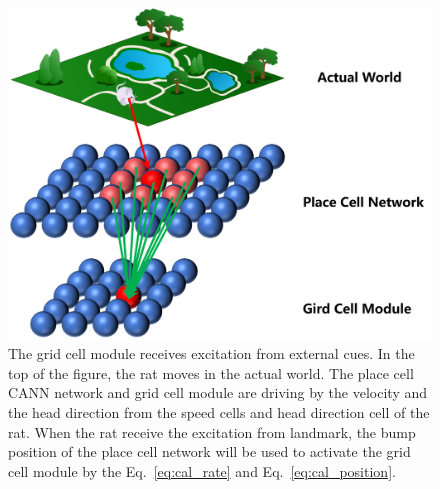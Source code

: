 \documentclass[final,5p,times,twocolumn]{elsarticle}
\begin{document}
\begin{figure}[!t]
	\centering
	\includegraphics[width=0.8\linewidth]{Figure/w-p-g.png}
	\caption{The grid cell module receives excitation from external cues. In the top of the figure, the rat moves in the actual world. The place cell CANN network and grid cell module are driving by the velocity and the head direction from the speed cells and head direction cell of the rat. When the rat receive the excitation from landmark, the bump position of the place cell network will be used to activate the grid cell module by the Eq.~\eqref{eq:cal_rate} and Eq.~\eqref{eq:cal_position}.}
	\label{fig:w2p2g}
\end{figure}
\end{document}
